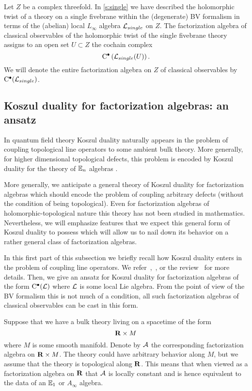 \documentclass[11pt]{amsart}
\begin{document}
\parsec[s:membraneobs]


\parsec[s:fivebraneobs]

Let $Z$ be a complex threefold. 
In \ref{s:single} we have described the holomorphic twist of a theory on a single fivebrane within the (degenerate) BV formalism in terms of the (abelian) local $L_\infty$ algebra $\mathcal L_{single}$ on $Z$. 
The factorization algebra of classical observables of the holomorphic twist of the single fivebrane theory assigns to an open set $U \subset Z$
the cochain complex
\[
{\rm C}^\bullet\left(\mathcal L_{single}(U)\right) .
\]
We will denote the entire factorization algebra on $Z$ of classical observables by~${\rm C}^\bullet(\mathcal L_{single})$.

\subsection{Koszul duality for factorization algebras: an ansatz} 

In quantum field theory Koszul duality naturally appears in the problem of coupling topological line operators to some ambient bulk theory. 
More generally, for higher dimensional topological defects, this problem is encoded by Koszul duality for the theory of $\mathbb E_n$ algebras \cite{??}.

More generally, we anticipate a general theory of Koszul duality for factorization algebras which should encode the problem of coupling arbitrary defects (without the condition of being topological).
Even for factorization algebras of holomorphic-topological nature this theory has not been studied in mathematics. 
Nevertheless, we will emphasize features that we expect this general form of Koszul duality to possess which will allow us to nail down its behavior on a rather general class of factorization algebras. 

In this first part of this subsection we briefly recall how Koszul duality enters in the problem of coupling line operators. 
We refer~\cite[\S 6]{CP1},~\cite[\S ??]{CG1}, or the review~\cite{PWkoszul} for more details. 
Then, we give an ansatz for Koszul duality for factorization algebras of the form ${\rm C}^\bullet(\mathcal L)$ where $\mathcal L$ is some local Lie algebra. 
From the point of view of the BV formalism this is not much of a condition, all such factorization algebras of classical observables can be cast in this form. 

\parsec[s:lines]
Suppose that we have a bulk theory living on a spacetime of the form 
\[
\mathbf{R} \times M 
\]
where $M$ is some smooth manifold. 
Denote by $\mathcal A$ the corresponding factorization algebra on $\mathbf{R} \times M$. 
The theory could have arbitrary behavior along $M$, but we assume that the theory is topological along $\mathbf{R}$. 
This means that when viewed as a factorization algebra on $\mathbf{R}$ that $\mathcal A$ is locally constant and is hence equivalent to the data of an $\mathbb E_1$ or $A_\infty$ algebra.
\end{document}
